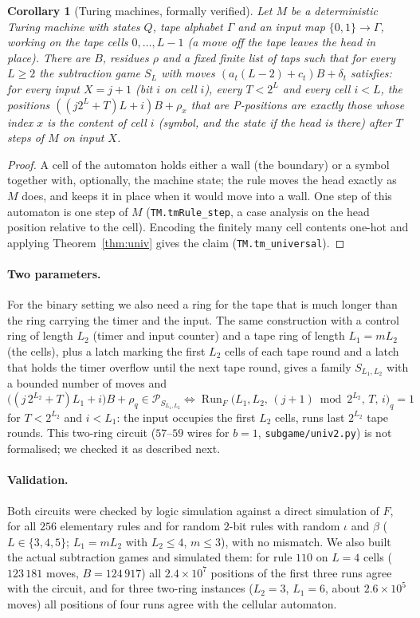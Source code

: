 \documentclass[11pt]{article}
\newtheorem{corollary}[theorem]{Corollary}
\theoremstyle{definition}
\newcommand{\cP}{\mathcal{P}}
\newcommand{\Run}{\operatorname{Run}}
\begin{document}
\begin{corollary}[Turing machines, formally verified]\label{cor:tm}
Let $M$ be a deterministic Turing machine with states $Q$, tape alphabet $\Gamma$ and an input map
$\{0,1\}\to\Gamma$, working on the tape cells $0,\dots,L-1$ (a move off the tape leaves the head in
place).  There are $B$, residues $\rho$ and a fixed finite list of taps such that for every $L\ge2$ the
subtraction game $S_L$ with moves $(a_t(L-2)+c_t)B+\delta_t$ satisfies: for every input $X=j+1$ (bit
$i$ on cell $i$), every $T<2^L$ and every cell $i<L$, the positions $((j2^L+T)L+i)B+\rho_x$ that are
P-positions are exactly those whose index $x$ is the content of cell $i$ (symbol, and the state if the head
is there) after $T$ steps of $M$ on input $X$.
\end{corollary}

\begin{proof}
A cell of the automaton holds either a wall (the boundary) or a symbol together with, optionally, the
machine state; the rule moves the head exactly as $M$ does, and keeps it in place when it would move
into a wall.  One step of this automaton is one step of $M$ (\texttt{TM.tmRule\_step}, a case analysis on
the head position relative to the cell).  Encoding the finitely many cell contents one-hot and applying
Theorem~\ref{thm:univ} gives the claim (\texttt{TM.tm\_universal}).
\end{proof}

\paragraph{Two parameters.}  For the binary setting we also need a ring for the tape that is much
longer than the ring carrying the timer and the input.  The same construction with a control ring of
length $L_2$ (timer and input counter) and a tape ring of length $L_1=mL_2$ (the cells), plus a latch
marking the first $L_2$ cells of each tape round and a latch that holds the timer overflow until the
next tape round, gives a family $S_{L_1,L_2}$ with a bounded number of moves and
\[
\bigl((j\,2^{L_2}+T)L_1+i\bigr)B+\rho_q\in\cP_{S_{L_1,L_2}}\iff
\Run_F\bigl(L_1,L_2,\,(j+1)\bmod 2^{L_2},\,T,\,i\bigr)_q=1
\]
for $T<2^{L_2}$ and $i<L_1$: the input occupies the first $L_2$ cells, runs last $2^{L_2}$ tape rounds.
This two-ring circuit ($57$--$59$ wires for $b=1$, \texttt{subgame/univ2.py}) is not formalised; we
checked it as described next.

\paragraph{Validation.}  Both circuits were checked by logic simulation against a direct simulation of
$F$, for all $256$ elementary rules and for random $2$-bit rules with random $\iota$ and $\beta$
($L\in\{3,4,5\}$; $L_1=mL_2$ with $L_2\le4$, $m\le3$), with no mismatch.  We also built the actual
subtraction games and simulated them: for rule $110$ on $L=4$ cells ($123\,181$ moves, $B=124\,917$)
all $2.4\times10^7$ positions of the first three runs agree with the circuit, and for three two-ring
instances ($L_2=3$, $L_1=6$, about $2.6\times10^5$ moves) all positions of four runs agree with the
cellular automaton.
\end{document}
